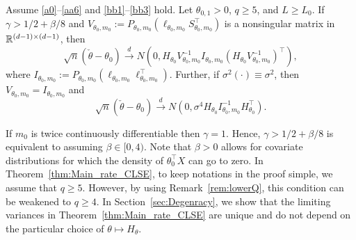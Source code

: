 { %


\begin{thm} \label{thm:Main_rate_CLSE}
 Assume \ref{a0}--\ref{aa6} and \ref{bb1}--\ref{bb3} hold. Let $\theta_{0,1}>0$, $q\ge 5$, and $L\ge L_0$.  
If $\gamma > 1/2+\beta/8$ and $V_{\theta_0,m_0}:=P_{\theta_0,m_0}({\ell}_{\theta_0,m_0} S^\top_{\theta_0,m_0})$ is a nonsingular matrix in $\mathbb{R}^{(d-1) \times (d-1)}$, then
\begin{equation}\label{eq:globalEffCLSE}
\sqrt{n} (\check{\theta}- \theta_0)\stackrel{d}{\rightarrow}   N(0,H_{\theta_0} V_{\theta_0,m_0}^{-1}  {I}_{\theta_0,m_0}(H_{\theta_0} V_{\theta_0,m_0}^{-1})^\top), 
\end{equation}
where  ${I}_{\theta_0,m_0} := P_{\theta_0,m_0} ({\ell}_{\theta_0,m_0}{\ell}^\top_{\theta_0,m_0})$. Further, if $\sigma^2(\cdot)\equiv\sigma^2$, then $V_{\theta_0,m_0}= {I}_{\theta_0,m_0}$ and
\begin{equation}\label{eq:localeffestimCLSE}
\sqrt{n} (\check{\theta}-\theta_0) \stackrel{d}{\rightarrow} N(0, \sigma^4 H_{\theta_0}{I}^{-1}_{\theta_0,m_0} H_{\theta_0}^\top).
\end{equation}
\end{thm}
\begin{remark}\label{rem:gammaBeta}
{If $m_0$ is twice continuously differentiable then $\gamma=1$. Hence, $\gamma > 1/2+\beta/8$ is equivalent to assuming $\beta \in [0,4)$. Note that $\beta>0$ allows for covariate distributions for which the density of $\theta_0^\top X$ can go to zero. In Theorem~\ref{thm:Main_rate_CLSE}, to keep notations in the proof simple, we assume that $q\ge 5$. However, by using Remark~\ref{rem:lowerQ}, this condition can be weakened to $q\ge4$. In Section~\ref{sec:Degenracy}, we show that the limiting variances in Theorem~\ref{thm:Main_rate_CLSE} are unique and do not depend on the particular choice of $\theta\mapsto H_\theta$.}
\end{remark}
}
